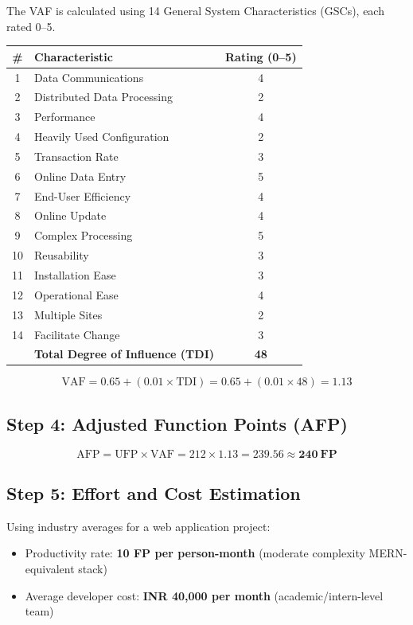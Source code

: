\documentclass[12pt,a4paper]{article}
\begin{document}
The VAF is calculated using 14 General System Characteristics (GSCs), each rated 0--5.

\begin{center}
\begin{tabular}{clc}
\toprule
\textbf{\#} & \textbf{Characteristic} & \textbf{Rating (0--5)} \\
\midrule
1 & Data Communications & 4 \\
2 & Distributed Data Processing & 2 \\
3 & Performance & 4 \\
4 & Heavily Used Configuration & 2 \\
5 & Transaction Rate & 3 \\
6 & Online Data Entry & 5 \\
7 & End-User Efficiency & 4 \\
8 & Online Update & 4 \\
9 & Complex Processing & 5 \\
10 & Reusability & 3 \\
11 & Installation Ease & 3 \\
12 & Operational Ease & 4 \\
13 & Multiple Sites & 2 \\
14 & Facilitate Change & 3 \\
\midrule
 & \textbf{Total Degree of Influence (TDI)} & \textbf{48} \\
\bottomrule
\end{tabular}
\end{center}

\[
\text{VAF} = 0.65 + (0.01 \times \text{TDI}) = 0.65 + (0.01 \times 48) = \mathbf{1.13}
\]

\subsection{Step 4: Adjusted Function Points (AFP)}

\[
\text{AFP} = \text{UFP} \times \text{VAF} = 212 \times 1.13 = \mathbf{239.56 \approx 240~FP}
\]

\subsection{Step 5: Effort and Cost Estimation}

Using industry averages for a web application project:
\begin{itemize}[noitemsep]
    \item Productivity rate: \textbf{10 FP per person-month} (moderate complexity MERN-equivalent stack)
    \item Average developer cost: \textbf{\textrm{INR} 40,000 per month} (academic/intern-level team)
\end{itemize}
\end{document}
